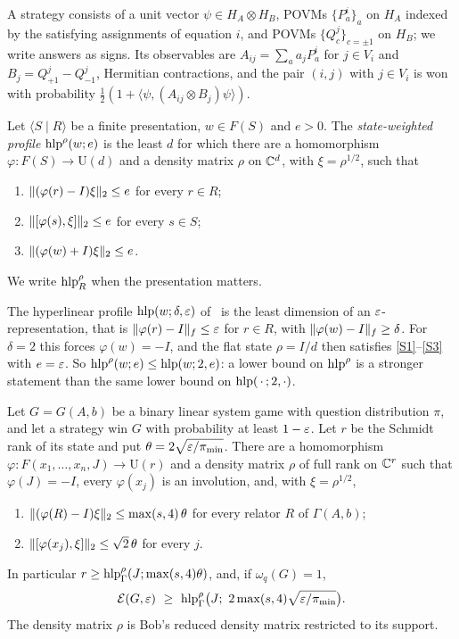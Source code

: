 A strategy consists of a unit vector $\psi\in H_A\otimes H_B$, POVMs $\{P^i_a\}_a$ on $H_A$ indexed by the satisfying
assignments of equation $i$, and POVMs $\{Q^j_c\}_{c=\pm1}$ on $H_B$; we write answers as signs. Its observables are
$A_{ij}=\sum_aa_jP^i_a$ for $j\in V_i$ and $B_j=Q^j_{+1}-Q^j_{-1}$, Hermitian contractions, and the pair $(i,j)$ with
$j\in V_i$ is won with probability $\frac12(1+\langle\psi,(A_{ij}\otimes B_j)\psi\rangle)$.

\begin{definition}\label{def:hlp-rho}
Let $\langle S\mid R\rangle$ be a finite presentation, $w\in F(S)$ and $e>0$. The \emph{state-weighted profile}
$\operatorname{hlp}^\rho(w;e)$ is the least $d$ for which there are a homomorphism $\varphi:F(S)\to\mathrm U(d)$ and a density matrix
$\rho$ on $\mathbb C^d$, with $\xi=\rho^{1/2}$, such that
\begin{enumerate}[label=(S\arabic*),itemsep=1pt]
\item\label{S1} $\lVert (\varphi(r)-I)\xi\rVert_2\le e$ for every $r\in R$;
\item\label{S2} $\lVert [\varphi(s),\xi]\rVert_2\le e$ for every $s\in S$;
\item\label{S3} $\lVert (\varphi(w)+I)\xi\rVert_2\le e$.
\end{enumerate}
We write $\operatorname{hlp}^\rho_R$ when the presentation matters.
\end{definition}

The hyperlinear profile $\operatorname{hlp}(w;\delta,\varepsilon)$ of~\cite[Definition~2.3]{SV18} is the least dimension of an
$\varepsilon$-representation, that is $\lVert \varphi(r)-I\rVert_{f}\le\varepsilon$ for $r\in R$, with $\lVert \varphi(w)-I\rVert_{f}\ge\delta$. For $\delta=2$
this forces $\varphi(w)=-I$, and the flat state $\rho=I/d$ then satisfies \ref{S1}--\ref{S3} with $e=\varepsilon$. So
$\operatorname{hlp}^\rho(w;e)\le\operatorname{hlp}(w;2,e)$: a lower bound on $\operatorname{hlp}^\rho$ is a stronger statement than the same lower bound on
$\operatorname{hlp}(\,\cdot\,;2,\cdot)$.

\begin{theorem}\label{thm:transfer}
Let $G=G(A,b)$ be a binary linear system game with question distribution $\pi$, and let a strategy win $G$ with
probability at least $1-\varepsilon$. Let $r$ be the Schmidt rank of its state and put $\theta=2\sqrt{\varepsilon/\pi_{\min}}$. There
are a homomorphism $\varphi:F(x_1,\dots,x_n,J)\to\mathrm U(r)$ and a density matrix $\rho$ of full rank on $\mathbb C^r$ such
that $\varphi(J)=-I$, every $\varphi(x_j)$ is an involution, and, with $\xi=\rho^{1/2}$,
\begin{enumerate}[label=(\alph*),itemsep=1pt]
\item $\lVert (\varphi(R)-I)\xi\rVert_2\le\max(s,4)\,\theta$ for every relator $R$ of $\Gamma(A,b)$;
\item $\lVert [\varphi(x_j),\xi]\rVert_2\le\sqrt2\,\theta$ for every $j$.
\end{enumerate}
In particular $r\ge\operatorname{hlp}^\rho_\Gamma(J;\max(s,4)\theta)$, and, if $\omega_q(G)=1$,
\[
\Ent(G,\eps)\ \ge\ \hlp^\rho_\Gamma\bigl(J;\ 2\max(s,4)\sqrt{\eps/\pi_{\min}}\bigr).
\]
The density matrix $\rho$ is Bob's reduced density matrix restricted to its support.
\end{theorem}

